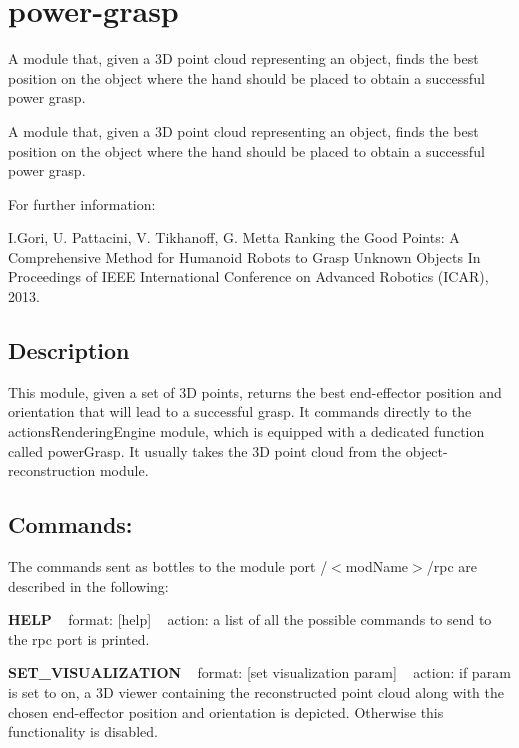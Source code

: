 \section{power-\/grasp}
\label{group__power-grasp}


A module that, given a 3\+D point cloud representing an object, finds the best position on the object where the hand should be placed to obtain a successful power grasp.  


A module that, given a 3\+D point cloud representing an object, finds the best position on the object where the hand should be placed to obtain a successful power grasp. 

For further information\+:

I.\+Gori, U. Pattacini, V. Tikhanoff, G. Metta Ranking the Good Points\+: A Comprehensive Method for Humanoid Robots to Grasp Unknown Objects In Proceedings of I\+E\+E\+E International Conference on Advanced Robotics (I\+C\+A\+R), 2013.\hypertarget{group__handIKModule_intro_sec}{}\subsection{Description}\label{group__handIKModule_intro_sec}
This module, given a set of 3\+D points, returns the best end-\/effector position and orientation that will lead to a successful grasp. It commands directly to the actions\+Rendering\+Engine module, which is equipped with a dedicated function called power\+Grasp. It usually takes the 3\+D point cloud from the object-\/reconstruction module.\hypertarget{group__handIKModule_rpc_port}{}\subsection{Commands\+:}\label{group__handIKModule_rpc_port}
The commands sent as bottles to the module port /$<$mod\+Name$>$/rpc are described in the following\+:

{\bfseries H\+E\+L\+P} ~\newline
format\+: \mbox{[}help\mbox{]} ~\newline
action\+: a list of all the possible commands to send to the rpc port is printed.

{\bfseries S\+E\+T\+\_\+\+V\+I\+S\+U\+A\+L\+I\+Z\+A\+T\+I\+O\+N} ~\newline
format\+: \mbox{[}set visualization param\mbox{]} ~\newline
action\+: if param is set to on, a 3\+D viewer containing the reconstructed point cloud along with the chosen end-\/effector position and orientation is depicted. Otherwise this functionality is disabled.

